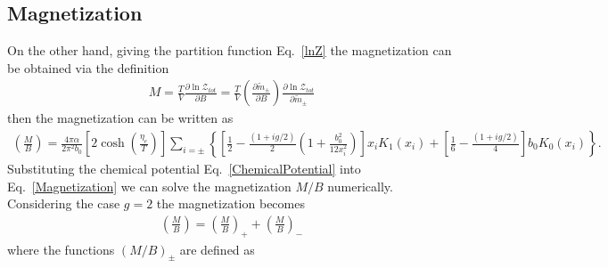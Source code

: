 \documentclass[Universe,article,submit,moreauthors,pdftex]{Definitions/mdpi}
\newcommand*{\req}[1]{Eq.~{\eqref{#1}}}
\begin{document}
\subsection{Magnetization}
On the other hand, giving the partition function \req{lnZ} the magnetization can be obtained via the definition
\begin{align}
M=\frac{T}{V}\frac{\partial \ln\mathcal{Z}_{tot}}{\partial B}=\frac{T}{V}\left(\frac{\partial\tilde m_\pm}{\partial B}\right)\frac{\partial \ln\mathcal{Z}_{tot}}{\partial\tilde m_\pm}
\end{align}
then the magnetization can be written as
\begin{align}\label{Magnetization}
\left(\frac{M}{B}\right)=\frac{4\pi\alpha}{2\pi^2b_0}\left[2\cosh\left(\frac{\eta_{e}}{T}\right)\right]\sum_{i=\pm}\left\{\left[\frac{1}{2}-\frac{(1+i g/2)}{2}\left(1+\frac{b^2_0}{12x^2_i}\right)\right]x_i K_1(x_i)+\left[\frac{1}{6}-\frac{(1+ig/2)}{4}\right]b_0K_0(x_i)\right\}.
\end{align}
Substituting the chemical potential \req{ChemicalPotential} into \req{Magnetization} we can solve the magnetization $M/B$ numerically.
Considering the case $g=2$ the magnetization becomes
\begin{align}
\left(\frac{M}{B}\right)=\left(\frac{M}{B}\right)_++\left(\frac{M}{B}\right)
_-
\end{align}
where the functions $(M/B)_\pm$ are defined as 
\end{document}
